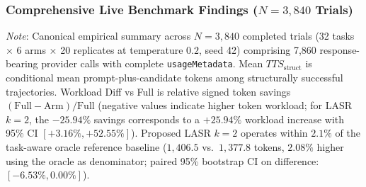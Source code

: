 \subsubsection{Comprehensive Live Benchmark Findings ($N=3,840$ Trials)}
\begin{table}[t]
\centering
\caption{Canonical Live Empirical Benchmark Summary ($N=3,840$ Trials, 32 Tasks, 6 Arms, Gemini 3.5 Flash-Lite)}
\label{tab:live_benchmark_n3840}
\setlength{\tabcolsep}{4.5pt}
\vspace{1mm}
\begin{minipage}{\textwidth}
\footnotesize
\textit{Note}: Canonical empirical summary across $N=3,840$ completed trials (32 tasks $\times$ 6 arms $\times$ 20 replicates at temperature $0.2$, seed 42) comprising 7,860 response-bearing provider calls with complete \texttt{usageMetadata}. Mean $TTS_{\text{struct}}$ is conditional mean prompt-plus-candidate tokens among structurally successful trajectories. Workload Diff vs Full is relative signed token savings $(\text{Full} - \text{Arm}) / \text{Full}$ (negative values indicate higher token workload; for LASR $k=2$, the $-25.94\%$ savings corresponds to a $+25.94\%$ workload increase with 95\% CI $[+3.16\%, +52.55\%]$). Proposed LASR $k=2$ operates within $2.1\%$ of the task-aware oracle reference baseline ($1,406.5$ vs.\ $1,377.8$ tokens, $2.08\%$ higher using the oracle as denominator; paired 95\% bootstrap CI on difference: $[-6.53\%, 0.00\%]$).
\end{minipage}
\end{table}
